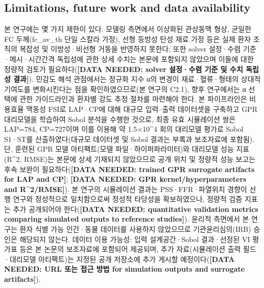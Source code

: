 \documentclass[preprint,12pt]{elsarticle}
\begin{document}
\subsection{Limitations, future work and data availability}
본 연구에는 몇 가지 제한이 있다. 모델링 측면에서 이상화된 관상동맥 형상, 균일한 FC 두께(fc\_av\_th 단일 스칼라 가정), 선형 등방성 탄성 재료 가정 등은 실제 환자 조직의 복잡성 및 이방성·비선형 거동을 반영하지 못한다; 또한 solver 설정·수렴 기준·메시·시간간격 독립성에 관한 상세 수치는 본문에 포함되지 않았으며 이들에 대한 정량적 검토가 필요하다(\textbf{[DATA NEEDED: solver 설정·수렴 기준 및 수치 독립성 결과]}). 민감도 해석 관점에서는 정규화 지수 α의 변경이 재료·혈류·형태의 상대적 기여도를 변화시킨다는 점을 확인하였으므로(본 연구의 C2.1), 향후 연구에서는 α 선택에 관한 가이드라인과 환자별 강도 추정 절차를 마련해야 한다. 본 파이프라인은 비용효율 맥동성 FSI로 LAP·CP에 대해 대규모 입력–출력 데이터셋을 구축하고 GPR 대리모델을 학습하여 Sobol 분석을 수행한 것으로, 최종 유효 시뮬레이션 쌍은 LAP=784, CP=727이며 이를 이용해 약 1.5×10\textasciicircum 4 회의 대리모델 평가로 Sobol S1·ST를 산출하였다(대규모 데이터셋 및 Sobol 결과는 부록과 보조자료에 포함됨). 단, 훈련된 GPR 모델 아티팩트(모델 파일·하이퍼파라미터)와 대리모델 성능 지표(R\textasciicircum 2, RMSE)는 본문에 상세 기재되지 않았으므로 공개 위치 및 정량적 성능 보고는 후속 보완이 필요하다(\textbf{[DATA NEEDED: trained GPR surrogate artifacts for LAP and CP]}; \textbf{[DATA NEEDED: GPR kernel/hyperparameters and R\textasciicircum 2/RMSE]}). 본 연구의 시뮬레이션 결과는 PSS·FFR·파열위치 경향이 선행 연구와 정성적으로 일치함으로써 정성적 타당성을 확보하였으나, 정량적 검증 지표는 추가 공개되어야 한다(\textbf{[DATA NEEDED: quantitative validation metrics comparing simulated outputs to reference studies]}). 윤리적 측면에서 본 연구는 환자 식별 가능 인간·동물 데이터를 사용하지 않았으므로 기관윤리심의(IRB) 승인은 해당되지 않는다. 데이터 이용 가능성: 입력 설계공간·Sobol 결과·선정된 VI 평가표 등은 본 논문의 보조자료에 포함되어 제공되며, 추가 자료(시뮬레이션 출력 필드·대리모델 아티팩트)는 지정된 공개 저장소에 추가 게시할 예정이다(\textbf{[DATA NEEDED: URL 또는 접근 방법 for simulation outputs and surrogate artifacts]}).
\end{document}
